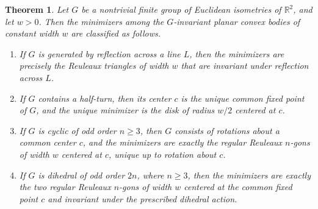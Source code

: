 \documentclass[11pt,letterpaper,reqno]{amsart}
\newtheorem{theorem}{Theorem}[section]
\begin{document}
\begin{theorem}\label{thm:main}
Let $G$ be a nontrivial finite group of Euclidean isometries of
$\mathbb R^2$, and let $w>0$. Then the minimizers among the
$G$-invariant planar convex bodies of constant width $w$ are classified
as follows.
\begin{enumerate}
    \item If $G$ is generated by reflection across a line $L$, then
    the minimizers are precisely the Reuleaux triangles of width $w$
    that are invariant under reflection across $L$.

    \item If $G$ contains a half-turn, then its center $c$ is the unique
    common fixed point of $G$, and the unique minimizer is the disk of
    radius $w/2$ centered at $c$.

    \item If $G$ is cyclic of odd order $n\geq3$, then $G$ consists of
    rotations about a common center $c$, and the minimizers are exactly
    the regular Reuleaux $n$-gons of width $w$ centered at $c$, unique
    up to rotation about $c$.

    \item If $G$ is dihedral of odd order $2n$, where $n\geq3$, then the
    minimizers are exactly the two regular Reuleaux $n$-gons of width
    $w$ centered at the common fixed point $c$ and invariant under the
    prescribed dihedral action.
\end{enumerate}
\end{theorem}
\fi
\end{document}

